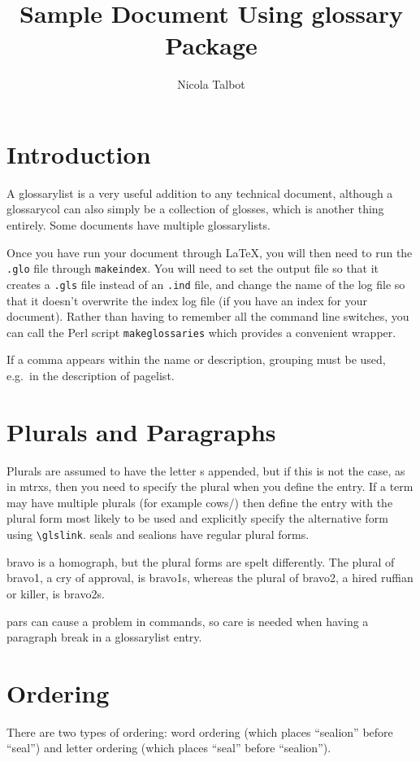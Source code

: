 \documentclass[a4paper]{report}
\begin{document}
\title{Sample Document Using glossary Package}
\author{Nicola Talbot}
\maketitle

\tableofcontents

\chapter{Introduction}

A \gls{glossarylist} is a very useful addition to any
technical document, although a \gls{glossarycol} can
also simply be a collection of glosses, which is
another thing entirely. Some documents have
multiple \glspl{glossarylist}.

Once you have run your document through \LaTeX, you
will then need to run the \texttt{.glo} file through
\texttt{makeindex}.  You will need to set the output
file so that it creates a \texttt{.gls} file instead
of an \texttt{.ind} file, and change the name of
the log file so that it doesn't overwrite the index
log file (if you have an index for your document).
Rather than having to remember all the command line
switches, you can call the \gls{Perl} script
\texttt{makeglossaries} which provides a convenient
wrapper.

If a comma appears within the name or description, grouping
must be used, e.g.\ in the description of \gls{pagelist}.

\chapter{Plurals and Paragraphs}

Plurals are assumed to have the letter s appended, but if this is
not the case, as in \glspl{mtrx}, then you need to specify the
plural when you define the entry. If a term may have multiple
plurals (for example \glspl{cow}/) then
define the entry with the plural form most likely to be used and
explicitly specify the alternative form using \verb|\glslink|.
\Glspl{seal} and \glspl{sealion} have regular plural forms.

\Gls{bravo} is a homograph, but the plural forms are spelt
differently. The plural of \gls{bravo1}, a cry of approval,
is \glspl{bravo1}, whereas the plural of \gls{bravo2}, a hired
ruffian or killer, is \glspl{bravo2}.

\Glspl{par} can cause a problem in commands, so care is needed
when having a paragraph break in a \gls{glossarylist} entry.

\chapter{Ordering}

There are two types of ordering: word ordering (which places
``\gls{sealion}'' before ``\gls{seal}'') and letter ordering
(which places ``\gls{seal}'' before ``\gls{sealion}'').

\printglossaries
\end{document}
